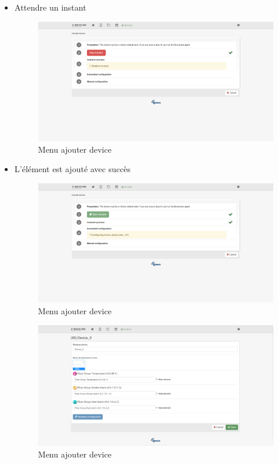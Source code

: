 \begin{itemize}
\item Attendre un instant

\begin{figure}[h]
	\center
	\includegraphics[scale=0.4]{./Images/png/add2_zwaveme.png}
	\caption{Menu ajouter device}
\end{figure}
\clearpage


\item L'élément est ajouté avec succès

\begin{figure}[h]
	\center
	\includegraphics[scale=0.4]{./Images/png/add3_zwaveme.png}
	\caption{Menu ajouter device}
\end{figure}
\clearpage

\begin{figure}[h]
	\center
	\includegraphics[scale=0.4]{./Images/png/add4_zwaveme.png}
	\caption{Menu ajouter device}
\end{figure}
\clearpage



\end{itemize}
